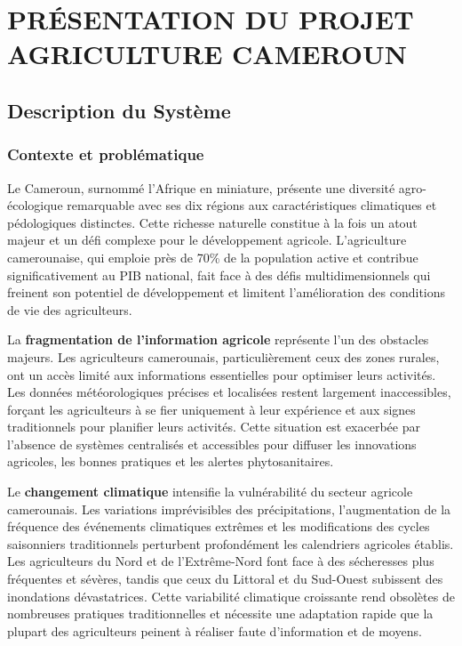 \chapter*{PRÉSENTATION DU PROJET AGRICULTURE CAMEROUN}


\section{Description du Système}

\subsection{Contexte et problématique}

Le Cameroun, surnommé l'Afrique en miniature, présente une diversité agro-écologique remarquable avec ses dix régions aux caractéristiques climatiques et pédologiques distinctes. Cette richesse naturelle constitue à la fois un atout majeur et un défi complexe pour le développement agricole. L'agriculture camerounaise, qui emploie près de 70\% de la population active et contribue significativement au PIB national, fait face à des défis multidimensionnels qui freinent son potentiel de développement et limitent l'amélioration des conditions de vie des agriculteurs.

La \textbf{fragmentation de l'information agricole} représente l'un des obstacles majeurs. Les agriculteurs camerounais, particulièrement ceux des zones rurales, ont un accès limité aux informations essentielles pour optimiser leurs activités. Les données météorologiques précises et localisées restent largement inaccessibles, forçant les agriculteurs à se fier uniquement à leur expérience et aux signes traditionnels pour planifier leurs activités. Cette situation est exacerbée par l'absence de systèmes centralisés et accessibles pour diffuser les innovations agricoles, les bonnes pratiques et les alertes phytosanitaires.

Le \textbf{changement climatique} intensifie la vulnérabilité du secteur agricole camerounais. Les variations imprévisibles des précipitations, l'augmentation de la fréquence des événements climatiques extrêmes et les modifications des cycles saisonniers traditionnels perturbent profondément les calendriers agricoles établis. Les agriculteurs du Nord et de l'Extrême-Nord font face à des sécheresses plus fréquentes et sévères, tandis que ceux du Littoral et du Sud-Ouest subissent des inondations dévastatrices. Cette variabilité climatique croissante rend obsolètes de nombreuses pratiques traditionnelles et nécessite une adaptation rapide que la plupart des agriculteurs peinent à réaliser faute d'information et de moyens.

